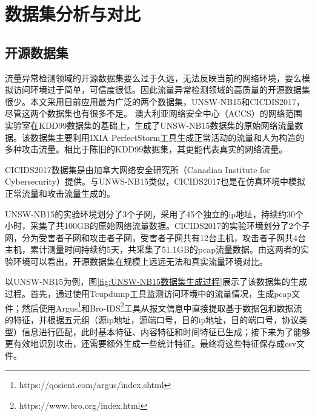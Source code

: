 
\chapter{数据集分析与对比}
\section{开源数据集}
流量异常检测领域的开源数据集要么过于久远，无法反映当前的网络环境，要么模拟访问环境过于简单，可信度很低。因此流量异常检测领域的高质量的开源数据集很少。本文采用目前应用最为广泛的两个数据集，UNSW-NB15和CICDIS2017，尽管这两个数据集也有很多不足。
澳大利亚网络安全中心（ACCS）的网络范围实验室在KDD99数据集的基础上，生成了UNSW-NB15数据集\cite{moustafa2015unsw}的原始网络流量数据。该数据集主要利用IXIA PerfectStorm工具生成正常活动的流量和人为构造的多种攻击流量。相比于陈旧的KDD99数据集\cite{ozgur2016review}，其更能代表真实的网络流量。

CICIDS2017数据集是由加拿大网络安全研究所（Canadian Institute for Cybersecurity）提供。与UNWS-NB15类似，CICIDS2017也是在仿真环境中模拟正常流量和攻击流量生成的。

UNSW-NB15的实验环境划分了3个子网，采用了45个独立的ip地址，持续约30个小时，采集了共100GB的原始网络流量数据。CICIDS2017的实验环境划分了2个子网，分为受害者子网和攻击者子网，受害者子网共有12台主机，攻击者子网共4台主机，累计测量时间持续约5天，共采集了51.1GB的pcap流量数据。由这两者的实验环境可以看出，开源数据集在规模上远远无法和真实流量环境对比。




以UNSW-NB15为例，图\ref{fig:UNSW-NB15数据集生成过程}展示了该数据集的生成过程。首先，通过使用Tcupdump工具监测访问环境中的流量情况，生成pcap文件；然后使用Argus\footnote{https://qosient.com/argus/index.shtml}和Bro-IDS\footnote{https://www.bro.org/index.html}工具从报文信息中直接提取基于数据包和数据流的特征，并根据五元组（源ip地址，源端口号，目的ip地址，目的端口号，协议类型）信息进行匹配，此时基本特征、内容特征和时间特征已生成；接下来为了能够更有效地识别攻击，还需要额外生成一些统计特征。最终将这些特征保存成csv文件。



